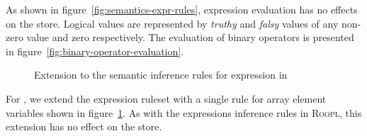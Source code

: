 As shown in figure~\ref{fig:semantics-expr-rules}, expression evaluation has no effects on the store. Logical values are represented by \textit{truthy} and \textit{falsy} values of any non-zero value and zero respectively. The evaluation of binary operators is presented in figure~\ref{fig:binary-operator-evaluation}.

\begin{figure}[ht]
    \begin{center}
        \DP
    \end{center}
    \caption{Extension to the semantic inference rules for expression in \rooplpp}
    \label{sec:semantics-expr-rule-extensions}
\end{figure}

For \rooplpp, we extend the expression ruleset with a single rule for array element variables shown in figure~\ref{sec:semantics-expr-rule-extensions}. As with the expressions inference rules in \textsc{Roopl}, this extension has no effect on the store. 

